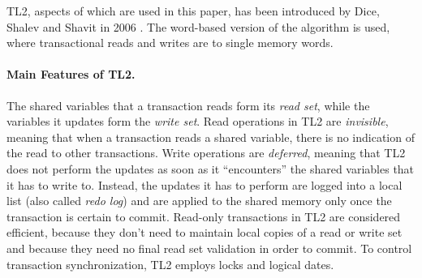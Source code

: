 TL2, aspects of which are used in this paper, has been introduced by Dice, Shalev and Shavit in 2006 \cite{dice06}.
The word-based version of the algorithm is used, %
where transactional reads and writes are to single memory words.
\paragraph{Main Features of TL2.} The shared variables  that a  transaction reads form its {\it read
set}, while the variables it updates form the {\it write set}. 
Read operations in TL2 are {\it invisible},  meaning  that when  a  transaction reads  a  shared 
variable,  there is no indication of the read to other transactions.  Write operations are  
{\it deferred}, meaning that  TL2 does not perform the updates  as soon as  it {}``encounters'' 
the shared  variables that  it has to write to. Instead, the 
updates it has to perform are logged into a local list (also called {\it redo log}) and   are  applied 
to the shared  memory only once the transaction is certain  to commit. 
Read-only transactions in TL2 are considered efficient, because they don{}'t need to maintain 
local copies of a read or write set  and because they need no final read set  validation in order to commit.
To control transaction synchronization, TL2 employs locks and logical dates. 


